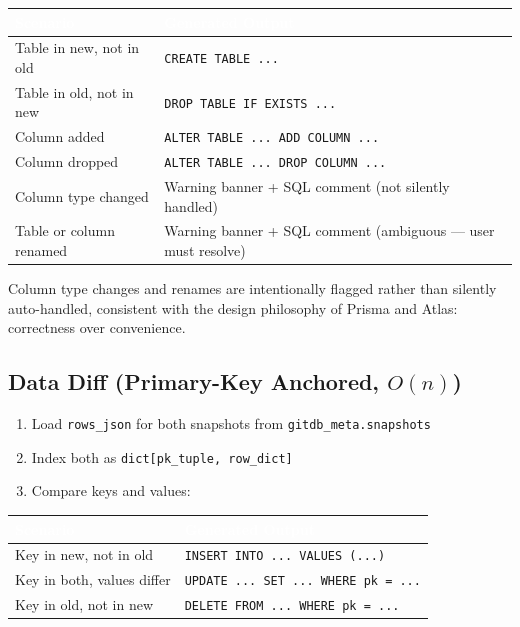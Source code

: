 \documentclass[12pt, a4paper]{article}
\begin{document}
\vspace{0.5em}
\renewcommand{\arraystretch}{1.4}
\begin{tabularx}{\textwidth}{>{\ttfamily}p{4.5cm} X}
\rowcolor{tableheader}
\textcolor{white}{\normalfont\bfseries Scenario} &
\textcolor{white}{\normalfont\bfseries Generated Output} \\
\midrule
Table in new, not in old      & \texttt{CREATE TABLE ...} \\
\rowcolor{lightgray}
Table in old, not in new      & \texttt{DROP TABLE IF EXISTS ...} \\
Column added                   & \texttt{ALTER TABLE ... ADD COLUMN ...} \\
\rowcolor{lightgray}
Column dropped                 & \texttt{ALTER TABLE ... DROP COLUMN ...} \\
Column type changed            & Warning banner + SQL comment (not silently handled) \\
\rowcolor{lightgray}
Table or column renamed        & Warning banner + SQL comment (ambiguous --- user must resolve) \\
\end{tabularx}
\vspace{0.5em}

\begin{tcolorbox}[infobox]
Column type changes and renames are intentionally flagged rather than
silently auto-handled, consistent with the design philosophy of
Prisma and Atlas: correctness over convenience.
\end{tcolorbox}

\subsection{Data Diff (Primary-Key Anchored, $O(n)$)}

\begin{enumerate}[leftmargin=1.5em, itemsep=0.3em]
    \item Load \texttt{rows\_json} for both snapshots from
    \texttt{gitdb\_meta.snapshots}
    \item Index both as \texttt{dict[pk\_tuple, row\_dict]}
    \item Compare keys and values:
\end{enumerate}

\vspace{0.5em}
\renewcommand{\arraystretch}{1.4}
\begin{tabularx}{\textwidth}{>{\ttfamily}p{5cm} X}
\rowcolor{tableheader}
\textcolor{white}{\normalfont\bfseries Scenario} &
\textcolor{white}{\normalfont\bfseries Generated Output} \\
\midrule
Key in new, not in old         & \texttt{INSERT INTO ... VALUES (...)} \\
\rowcolor{lightgray}
Key in both, values differ     & \texttt{UPDATE ... SET ... WHERE pk = ...} \\
Key in old, not in new         & \texttt{DELETE FROM ... WHERE pk = ...} \\
\end{tabularx}
\vspace{0.5em}
\end{document}
